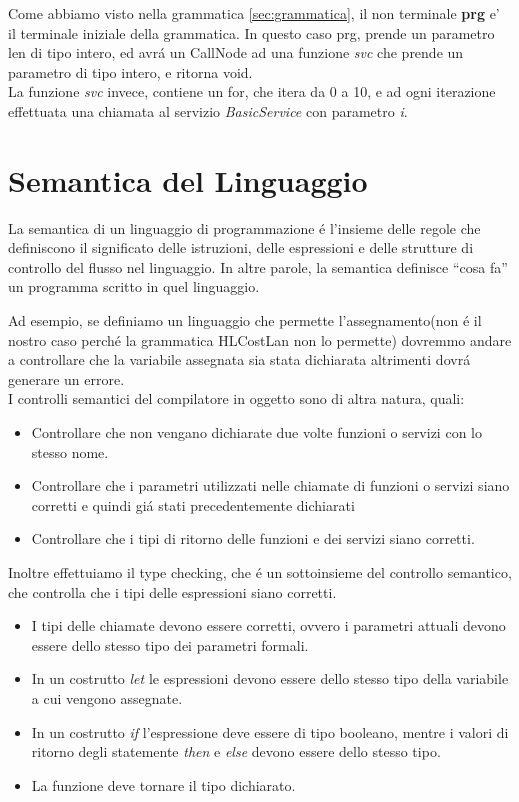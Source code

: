 \documentclass[../../main.tex]{subfiles}
\begin{document}
Come abbiamo visto nella grammatica \ref{sec:grammatica}, il non terminale \textbf{prg} e' il terminale iniziale della grammatica. In questo caso prg, prende un parametro len di tipo intero, ed avrá un CallNode ad una funzione \textit{svc} che prende un parametro di tipo intero, e ritorna void.\\
La funzione \textit{svc} invece, contiene un for, che itera da 0 a 10, e ad ogni iterazione effettuata una chiamata al servizio \textit{BasicService} con parametro \textit{i}.\\
\section{Semantica del Linguaggio}\label{sec:semantica}
La semantica di un linguaggio di programmazione é l'insieme delle regole che definiscono il significato delle istruzioni, delle espressioni e delle strutture di controllo del flusso nel linguaggio. In altre parole, la semantica definisce ``cosa fa'' un programma scritto in quel linguaggio.

Ad esempio, se definiamo un linguaggio che permette l'assegnamento(non é il nostro caso perché la grammatica HLCostLan non lo permette) dovremmo andare a controllare che la variabile assegnata sia stata dichiarata altrimenti dovrá generare un errore.\\
I controlli semantici del compilatore in oggetto sono di altra natura, quali:
\begin{itemize}
    \item Controllare che non vengano dichiarate due volte funzioni o servizi con lo stesso nome.
    \item Controllare che i parametri utilizzati nelle chiamate di funzioni o servizi siano corretti e quindi giá stati precedentemente dichiarati
    \item Controllare che i tipi di ritorno delle funzioni e dei servizi siano corretti.
\end{itemize}
Inoltre effettuiamo il type checking, che é un sottoinsieme del controllo semantico, che controlla che i tipi delle espressioni siano corretti.\\
\begin{itemize}
    \item I tipi delle chiamate devono essere corretti, ovvero i parametri attuali devono essere dello stesso tipo dei parametri formali.
    \item In un costrutto \textit{let} le espressioni devono essere dello stesso tipo della variabile a cui vengono assegnate.
    \item In un costrutto \textit{if} l'espressione deve essere di tipo booleano, mentre i valori di ritorno degli statemente \textit{then} e \textit{else} devono essere dello stesso tipo.
    \item La funzione deve tornare il tipo dichiarato.
\end{itemize}
\end{document}
